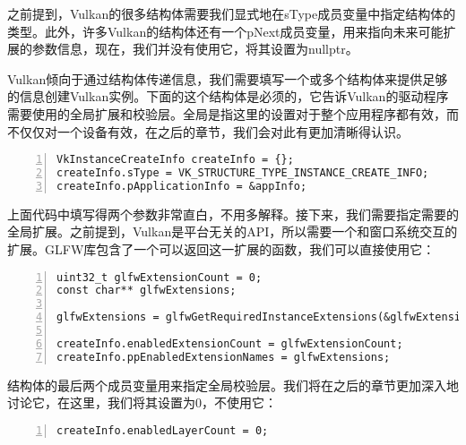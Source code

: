 \documentclass{ctexart}
\begin{document}
之前提到，Vulkan的很多结构体需要我们显式地在sType成员变量中指定结构体的类型。此外，许多Vulkan的结构体还有一个pNext成员变量，用来指向未来可能扩展的参数信息，现在，我们并没有使用它，将其设置为nullptr。

Vulkan倾向于通过结构体传递信息，我们需要填写一个或多个结构体来提供足够的信息创建Vulkan实例。下面的这个结构体是必须的，它告诉Vulkan的驱动程序需要使用的全局扩展和校验层。全局是指这里的设置对于整个应用程序都有效，而不仅仅对一个设备有效，在之后的章节，我们会对此有更加清晰得认识。

\begin{lstlisting}[language={[ANSI]C},keywordstyle=\color{blue!70},commentstyle=\color{red!50!green!50!blue!50},frame=shadowbox, rulesepcolor=\color{red!20!green!20!blue!20},basicstyle=\small,numbers=left, numberstyle=\tiny,breaklines=true]
VkInstanceCreateInfo createInfo = {};
createInfo.sType = VK_STRUCTURE_TYPE_INSTANCE_CREATE_INFO;
createInfo.pApplicationInfo = &appInfo;
\end{lstlisting}

上面代码中填写得两个参数非常直白，不用多解释。接下来，我们需要指定需要的全局扩展。之前提到，Vulkan是平台无关的API，所以需要一个和窗口系统交互的扩展。GLFW库包含了一个可以返回这一扩展的函数，我们可以直接使用它：

\begin{lstlisting}[language={[ANSI]C},keywordstyle=\color{blue!70},commentstyle=\color{red!50!green!50!blue!50},frame=shadowbox, rulesepcolor=\color{red!20!green!20!blue!20},basicstyle=\small,numbers=left, numberstyle=\tiny,breaklines=true]
uint32_t glfwExtensionCount = 0;
const char** glfwExtensions;

glfwExtensions = glfwGetRequiredInstanceExtensions(&glfwExtensionCount);

createInfo.enabledExtensionCount = glfwExtensionCount;
createInfo.ppEnabledExtensionNames = glfwExtensions;
\end{lstlisting}

结构体的最后两个成员变量用来指定全局校验层。我们将在之后的章节更加深入地讨论它，在这里，我们将其设置为0，不使用它：

\begin{lstlisting}[language={[ANSI]C},keywordstyle=\color{blue!70},commentstyle=\color{red!50!green!50!blue!50},frame=shadowbox, rulesepcolor=\color{red!20!green!20!blue!20},basicstyle=\small,numbers=left, numberstyle=\tiny,breaklines=true]
createInfo.enabledLayerCount = 0;
\end{lstlisting}
\end{document}
